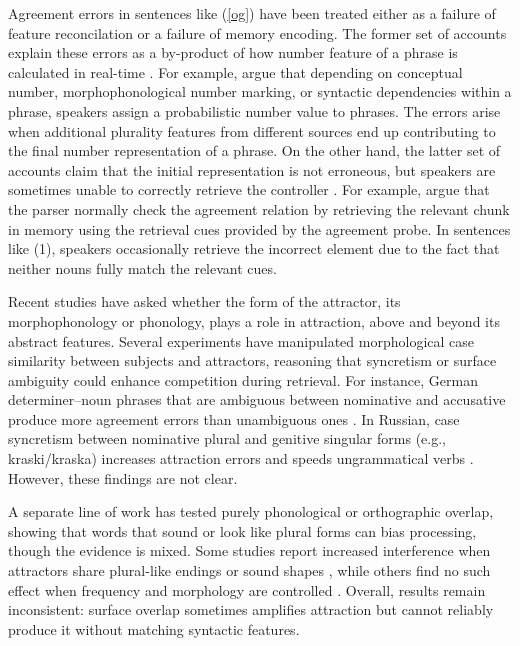 \documentclass[
  authoryear,
  preprint]{elsarticle}
\begin{document}
Agreement errors in sentences like (\ref{og}) have been treated either
as a failure of feature reconcilation or a failure of memory encoding.
The former set of accounts explain these errors as a by-product of how
number feature of a phrase is calculated in real-time
\citep{BockMiller:1991, EberhardEtAl2005, HammerlyEtAl2019}. For
example, \citet{EberhardEtAl2005} argue that depending on conceptual
number, morphophonological number marking, or syntactic dependencies
within a phrase, speakers assign a probabilistic number value to
phrases. The errors arise when additional plurality features from
different sources end up contributing to the final number representation
of a phrase. On the other hand, the latter set of accounts claim that
the initial representation is not erroneous, but speakers are sometimes
unable to correctly retrieve the controller
\citep{WagersEtAl:2009, Dillon2013a}. For example,
\citet{WagersEtAl:2009} argue that the parser normally check the
agreement relation by retrieving the relevant chunk in memory using the
retrieval cues provided by the agreement probe. In sentences like (1),
speakers occasionally retrieve the incorrect element due to the fact
that neither nouns fully match the relevant cues.

Recent studies have asked whether the form of the attractor, its
morphophonology or phonology, plays a role in attraction, above and
beyond its abstract features. Several experiments have manipulated
morphological case similarity between subjects and attractors, reasoning
that syncretism or surface ambiguity could enhance competition during
retrieval. For instance, German determiner--noun phrases that are
ambiguous between nominative and accusative produce more agreement
errors than unambiguous ones \citep{HartsuikerEtAl2003}. In Russian,
case syncretism between nominative plural and genitive singular forms
(e.g., kraski/kraska) increases attraction errors and speeds
ungrammatical verbs \citep{Slioussar2018}. However, these findings are
not clear.

A separate line of work has tested purely phonological or orthographic
overlap, showing that words that sound or look like plural forms can
bias processing, though the evidence is mixed. Some studies report
increased interference when attractors share plural-like endings or
sound shapes \citep{HaskellMacDonald2003, BrehmEtAl2020}, while others
find no such effect when frequency and morphology are controlled
\citep{BockEberhard1993}. Overall, results remain inconsistent: surface
overlap sometimes amplifies attraction but cannot reliably produce it
without matching syntactic features.
\end{document}
